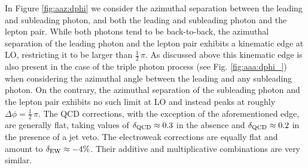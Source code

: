 In Figure \ref{fig:aaz:dphi} we consider the azimuthal separation 
between the leading and subleading photon, and both the leading 
and subleading photon and the lepton pair.
While both photons tend to be back-to-back, the azimuthal 
separation of the leading photon and the lepton pair exhibits 
a kinematic edge at LO, restricting it to be larger than 
$\tfrac{1}{2}\,\pi$. 
As discussed above this kinematic edge is also present in the case of the triple photon process
(see Fig. \ref{fig:aaa:dphi_}) when considering the azimuthal angle between
the leading and any subleading photon.
On the contrary, the azimuthal separation of the subleading 
photon and the lepton pair exhibits no such limit at LO and 
instead peaks at roughly $\Delta\phi=\tfrac{1}{2}\,\pi$. 
The QCD corrections, with the exception of the aforementioned 
edge, are generally flat, taking values of $\delta_\text{QCD}\approx 0.3$ 
in the absence and $\delta_\text{QCD}\approx 0.2$ in the presence 
of a jet veto. 
The electroweak corrections are equally flat and amount to 
$\delta_\text{EW}\approx-4\%$. 
Their additive and multiplicative combinations are very 
similar.


